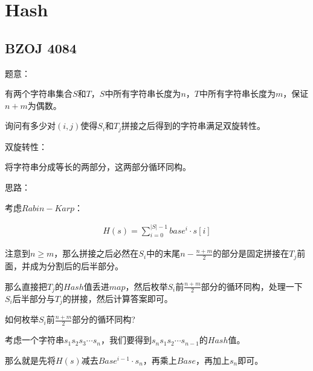 \section{Hash}
\subsection{BZOJ 4084}
题意：\par
有两个字符串集合$S$和$T$，$S$中所有字符串长度为$n$，$T$中所有字符串长度为$m$，保证$n + m$为偶数。\par
询问有多少对$(i, j)$使得$S_i$和$T_j$拼接之后得到的字符串满足双旋转性。\par
双旋转性：\par
将字符串分成等长的两部分，这两部分循环同构。\par
\par
思路：\par
考虑$Rabin-Karp$：\par
\begin{eqnarray*}
H(s) = \sum\limits_{i = 0}^{|S| - 1} base^i \cdot s[i]
\end{eqnarray*}\par
\par
注意到$n \geq m$，那么拼接之后必然在$S_i$中的末尾$n - \frac{n + m}{2}$的部分是固定拼接在$T_j$前面，并成为分割后的后半部分。\par
那么直接把$T_j$的$Hash$值丢进$map$，然后枚举$S_i$前$\frac{n + m}{2}$部分的循环同构，处理一下$S_i$后半部分与$T_j$的拼接，然后计算答案即可。\par
\par
如何枚举$S_i$前$\frac{n + m}{2}$部分的循环同构?\par
考虑一个字符串$s_1s_2s_3 \cdots s_n$，我们要得到$s_ns_1s_2\cdots s_{n - 1}$的$Hash$值。\par
那么就是先将$H(s)$减去$Base^{i - 1} \cdot s_n$，再乘上$Base$，再加上$s_n$即可。\par
